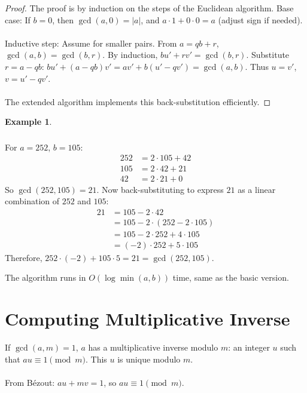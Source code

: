 \documentclass[12pt,openany]{book}
\theoremstyle{definition}
\newtheorem{example}{Example}[chapter]
\theoremstyle{plain}
\theoremstyle{remark}
\begin{document}
\begin{proof}
  The proof is by induction on the steps of the Euclidean algorithm. Base case: If $b = 0$, then $\gcd(a, 0) = |a|$, and $a \cdot 1 + 0 \cdot 0 = a$ (adjust sign if needed).
  \noindent
  \\ \\
  Inductive step: Assume for smaller pairs. From $a = q b + r$, $\gcd(a, b) = \gcd(b, r)$. By induction, $b u' + r v' = \gcd(b, r)$. Substitute $r = a - q b$: $b u' + (a - q b) v' = a v' + b (u' - q v') = \gcd(a, b)$. Thus $u = v'$, $v = u' - q v'$.
  \noindent
  \\ \\
  The extended algorithm implements this back-substitution efficiently.
\end{proof}

\begin{example}\subsubsection*{}
  For $a = 252$, $b = 105$:
  \begin{align*}
    252 &= 2 \cdot 105 + 42 \\
    105 &= 2 \cdot 42 + 21 \\
     42 &= 2 \cdot 21 + 0
  \end{align*}
  So $\gcd(252, 105) = 21$.
  \medskip
  Now back-substituting to express $21$ as a linear combination of $252$ and $105$:
  \begin{align*}
    21 &= 105 - 2 \cdot 42 \\
       &= 105 - 2 \cdot (252 - 2 \cdot 105) \\
       &= 105 - 2 \cdot 252 + 4 \cdot 105 \\
       &= (-2) \cdot 252 + 5 \cdot 105
  \end{align*}
  \medskip
  Therefore, $252 \cdot (-2) + 105 \cdot 5 = 21 = \gcd(252, 105)$.
\end{example}
\noindent
The algorithm runs in $O(\log \min(a, b))$ time, same as the basic version.

\section{Computing Multiplicative Inverse}

If $\gcd(a, m) = 1$, $a$ has a multiplicative inverse modulo $m$: an integer $u$ such that $a u \equiv 1 \pmod{m}$. This $u$ is unique modulo $m$.
\noindent
\\ \\
From Bézout: $a u + m v = 1$, so $a u \equiv 1 \pmod{m}$.
\end{document}
